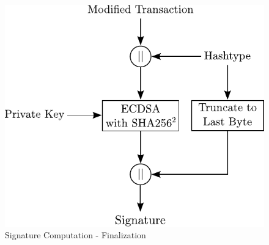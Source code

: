 \begin{figure}[ht!]
 \centering
 \includegraphics[scale=0.8]{images/Signature-Finalization.pdf}
 \caption{Signature Computation - Finalization} \label{fig:SigFin-SighashAll}
\end{figure}